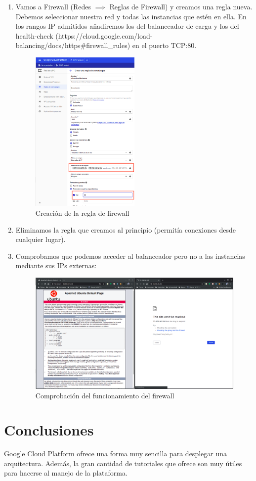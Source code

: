 \documentclass[12pt,spanish]{article}
\begin{document}
\begin{enumerate}
	\item Vamos a Firewall (Redes $\implies$ Reglas de Firewall) y creamos una regla nueva. Debemos seleccionar nuestra red y todas las instancias que estén en ella. En los rangos IP admitidos añadiremos los del balanceador de carga y los del health-check (https://cloud.google.com/load-balancing/docs/https\#firewall\_rules) en el puerto TCP:80.
	\begin{figure}[H]
		\centering
		\includegraphics[width=0.5\textwidth]{project/firewall_balancer.png}
		\caption{Creación de la regla de firewall}
	\end{figure}
	\item Eliminamos la regla que creamos al principio (permitía conexiones desde cualquier lugar).
	\item Comprobamos que podemos acceder al balanceador pero no a las instancias mediante sus IPs externas:
	\begin{figure}[H]
		\centering
		\includegraphics[width=\textwidth]{project/new_firewall_ok.png}
		\caption{Comprobación del funcionamiento del firewall}
	\end{figure}
\end{enumerate}

\section{Conclusiones}

Google Cloud Platform ofrece una forma muy sencilla para desplegar una arquitectura. Además, la gran cantidad de tutoriales que ofrece son muy útiles para hacerse al manejo de la plataforma.
\newpage

\nocite{*}

\end{document}
